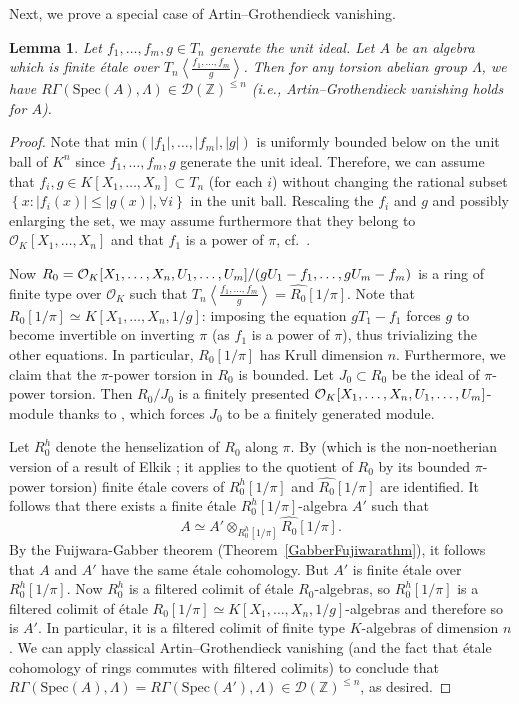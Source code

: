 \documentclass[reqno]{amsart}
\newcommand{\spec}{\mathrm{Spec}}
\newcommand{\D}{\mathcal{D}}
\newtheorem{lemma}[theorem]{Lemma}
\theoremstyle{definition}
\begin{document}
Next, we prove a special case of Artin--Grothendieck vanishing. 
\begin{lemma} 
\label{specialcaseartin}
Let $f_1, \dots, f_m, g \in  T_n$ generate the unit ideal. 
Let $A$ be an algebra which is finite \'etale over $T_n \left \langle
 \frac{f_1, \dots, f_m}{g} \right\rangle$. Then 
 for any torsion abelian group $\Lambda$, 
 we have 
$R \Gamma( \spec(A), \Lambda) \in \D( \mathbb{Z})^{\leq n}$ (i.e.,
Artin--Grothendieck
vanishing holds for $A$).  
 \end{lemma} 
\begin{proof} 
Note that $\mathrm{min}( |f_1|, \dots, |f_m|, |g|)$ is uniformly bounded below on the unit ball
of $K^n$ since $f_1, \dots, f_m, g$ generate the unit ideal. 
Therefore, we can assume that $f_i, g \in K[X_1, \dots, X_n] \subset T_n$ (for
each $i$) without
changing the rational subset $\left\{x: |f_i(x)| \leq |g(x)|, \forall i\right\}$ in the
unit ball. 
Rescaling the $f_i$ and $g$ and possibly enlarging the set, we may assume furthermore that
they belong to $\mathcal{O}_K[X_1,
\dots, X_n]$ and that $f_1$ is a power of $\pi$, cf.~\cite[Prop.~3.9]{Hubercts}. 

Now  $R_0 = \mathcal{O}_K [X_1, \dots, X_n, U_1, \dots, U_m]/( gU_1 - f_1, \dots, g U_m - f_m)$ is a ring of finite type over
$\mathcal{O}_K$ such that $T_n \left \langle \frac{f_1, \dots, f_m}{g}
\right\rangle = \widehat{R_0}[1/\pi]$.  Note that $R_0[1/\pi] \simeq K[X_1,
\dots, X_n, 1/g]$: imposing the equation $gT_1 - f_1$ forces $g$ to become
invertible on inverting $\pi$ (as $f_1$ is a power of $\pi$), thus trivializing
the other equations. In particular, $R_0[1/\pi]$ has Krull dimension $n$.
Furthermore, we claim that the $\pi$-power torsion in $R_0$ is bounded. 
Let $J_0 \subset R_0$ be the ideal of $\pi$-power torsion. 
Then $R_0/J_0$ is a finitely presented $\mathcal{O}_K[X_1, \dots, X_n, U_1, \dots,
U_m]$-module thanks to \cite[Tag 053E]{stacks-project}, which forces $J_0$ to be
a finitely generated module. 

Let $R_0^h$ denote the henselization of $R_0$ along $\pi$. 
By  \cite[Proposition 5.4.54]{GabberRamero} (which is the non-noetherian
version of a result of Elkik \cite{Elkik}; it applies to the quotient of $R_0$
by its bounded $\pi$-power torsion) 
finite \'etale covers of $R_0^h[1/\pi]$ and $\widehat{R_0}[1/\pi]$ are identified. It follows that there exists a 
finite \'etale $R_0^h[1/\pi]$-algebra $A'$ such that
\[ A \simeq A' \otimes_{R_0^h[1/\pi]} \widehat{R_0}[1/\pi] .  \]
By the Fuijwara-Gabber theorem (Theorem~\ref{GabberFujiwarathm}), 
it follows that $A$ and $A'$ have the same \'etale cohomology.  But $A'$ is finite \'etale over $R_0^h[1/\pi]$.  Now $R_0^h$ is a filtered colimit of \'etale $R_0$-algebras, 
so $R_0^h[1/\pi]$ is a filtered colimit of \'etale $R_0[1/\pi] \simeq K[X_1, \dots, X_n, 1/g]$-algebras and therefore so is $A'$. 
In particular, it is a filtered colimit of finite type $K$-algebras of dimension $n$. 
We can apply classical Artin--Grothendieck vanishing (and the fact that \'etale cohomology of
rings commutes with filtered colimits) to conclude that $R \Gamma( \spec(A),
\Lambda) = R \Gamma( \spec(A'), \Lambda) \in \D(\mathbb{Z})^{\leq n}$,
as desired. 
\end{proof} 
\end{document}
